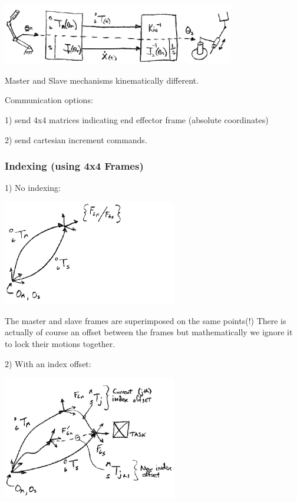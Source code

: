 \includegraphics[width=4.0in]{figs14/00404.eps}

Master and Slave mechanisms kinematically different.

Communication options:

1) send 4x4 matrices indicating end effector frame (absolute coordinates)

2) send cartesian increment commands.


\subsubsection{Indexing (using 4x4 Frames)}

1) No indexing:

\includegraphics[width=3.0in]{figs14/00405.eps}

 The master and slave frames are superimposed on the same points(!)    There is actually of course an offset between the frames but mathematically we ignore it to lock their motions together. 	%



2) With an index offset:

\includegraphics[width=3.0in]{figs14/00406.eps}

